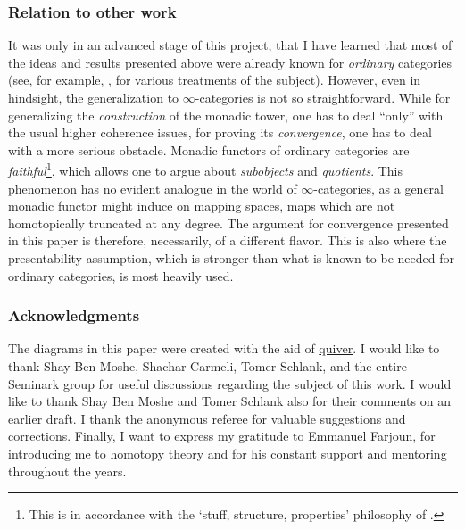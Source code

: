 \documentclass[english]{article}
\begin{document}
\subsubsection{Relation to other work}
It was only in an advanced stage of this project, that I have learned that most of the ideas and results presented above were already known for \textit{ordinary} categories (see, for example, \cite{applegate1970iterated,dubuc2006kan,macdonald1982tower,adamek1989monadic}, for various treatments of the subject). However, even in hindsight, the generalization to $\infty$-categories is not so straightforward. While for generalizing the \textit{construction} of the monadic tower, one has to deal ``only'' with the usual higher coherence issues, for proving its \textit{convergence}, one has to deal with a more serious obstacle. Monadic functors of ordinary categories are \textit{faithful}\footnote{This is in accordance with the `stuff, structure, properties' philosophy of \cite[Section 2.4]{baez2010lectures}.}, which allows one to argue about \textit{subobjects} and \textit{quotients}. This phenomenon has no evident analogue in the world of  $\infty$-categories, as a general monadic functor might induce on mapping spaces, maps which are not homotopically truncated at any degree. The argument for convergence presented in this paper is therefore, necessarily, of a different flavor. This is also where the presentability assumption, which is stronger than what is known to be needed for ordinary categories, is most heavily used. 


\subsubsection{Acknowledgments}

The diagrams in this paper were created with the aid of
\href{https://q.uiver.app/}{quiver}. I would like to thank Shay Ben Moshe, Shachar Carmeli, Tomer Schlank, and the entire Seminark group for useful discussions regarding the subject of this work. I would like to thank Shay Ben Moshe and Tomer Schlank also for their comments on an earlier draft. I thank the anonymous referee for valuable suggestions and corrections.  
Finally, I want to express my gratitude to Emmanuel Farjoun, for introducing me to homotopy theory and for his constant support and mentoring throughout the years. 
\end{document}
